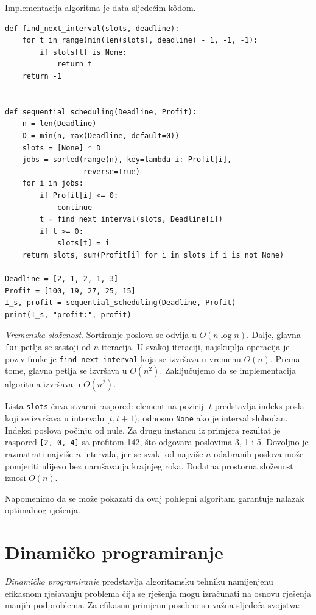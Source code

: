 Implementacija algoritma je data sljedećim k\^odom. 
 
 \begin{verbatim}
def find_next_interval(slots, deadline):
    for t in range(min(len(slots), deadline) - 1, -1, -1):
        if slots[t] is None:
            return t
    return -1


def sequential_scheduling(Deadline, Profit):
    n = len(Deadline)
    D = min(n, max(Deadline, default=0))
    slots = [None] * D
    jobs = sorted(range(n), key=lambda i: Profit[i],
                  reverse=True)
    for i in jobs:
        if Profit[i] <= 0:
            continue
        t = find_next_interval(slots, Deadline[i])
        if t >= 0:
            slots[t] = i
    return slots, sum(Profit[i] for i in slots if i is not None)

Deadline = [2, 1, 2, 1, 3]
Profit = [100, 19, 27, 25, 15]
I_s, profit = sequential_scheduling(Deadline, Profit)
print(I_s, "profit:", profit)
\end{verbatim}

\textit{Vremenska složenost}. Sortiranje poslova se odvija u $O(n \log n)$. Dalje, glavna \texttt{for}-petlja se sastoji od $n$ iteracija. U svakoj iteraciji, najskuplja operacija je poziv funkcije \texttt{find\_next\_interval} koja se izvršava u vremenu $O(n)$. Prema tome,   glavna petlja se izvršava u $O(n^2)$. Zaključujemo da se implementacija algoritma izvršava u $O(n^2)$. 

Lista \texttt{slots} čuva stvarni raspored: element na poziciji $t$ predstavlja indeks posla koji se izvršava u intervalu $[t,t+1)$, odnosno \texttt{None} ako je interval slobodan. Indeksi poslova počinju od nule. Za drugu instancu iz primjera rezultat je raspored \texttt{[2, 0, 4]} sa profitom 142, što odgovara poslovima 3, 1 i 5. Dovoljno je razmatrati najviše $n$ intervala, jer se svaki od najviše $n$ odabranih poslova može pomjeriti ulijevo bez narušavanja krajnjeg roka. Dodatna prostorna složenost iznosi $O(n)$.

Napomenimo da se može pokazati da ovaj pohlepni algoritam garantuje nalazak optimalnog rješenja.

\section{Dinamičko programiranje}

\textit{Dinamičko programiranje} predstavlja algoritamsku tehniku namijenjenu efikasnom rješavanju problema čija se rješenja mogu izračunati na osnovu rješenja manjih podproblema. Za efikasnu primjenu posebno su važna sljedeća svojstva:


